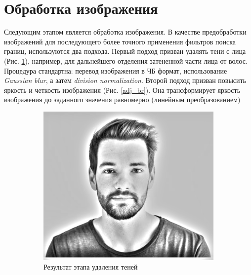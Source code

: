 \documentclass[a4paper, 11pt]{article}
\begin{document}
\section{Обработка изображения}
Следующим этапом является обработка изображения. В качестве предобработки изображений для последующего более точного применения фильтров поиска границ, используются два подхода. 
Первый подход призван удалять тени с лица (Рис. \ref{img_tr}), например, для дальнейшего отделения затененной части лица от волос. Процедура стандартна: перевод изображения в ЧБ формат, использование \textit{Gaussian blur}, а затем \textit{division normalization}. 
Второй подход призван повысить яркость и четкость изображения (Рис. \ref{adj_br}). Она трансформирует яркость изображения до заданного значения равномерно (линейным преобразованием)
\begin{figure}[h!]
	\centering
	\begin{subfigure}{0.49\linewidth}
		\includegraphics[width=\linewidth]{"img_transform.png"}
		\caption{Результат этапа удаления теней} \label{img_tr}
	\end{subfigure}
	\begin{subfigure}{0.49\linewidth}

\end{subfigure}
\end{figure}
\end{document}
